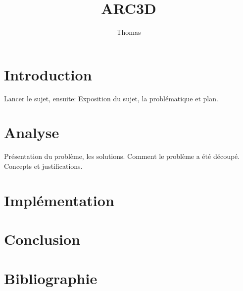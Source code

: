 \documentclass{report}
\author{Thomas \bsc{Roulin}}
\title{ARC3D}
\begin{document}
\maketitle



\tableofcontents

\chapter{Introduction}
Lancer le sujet, ensuite:
Exposition du sujet, la problématique et plan.


\chapter{Analyse}
 Présentation du problème, les solutions. Comment le problème a été découpé.
 Concepts et justifications.

\chapter{Implémentation}







\chapter{Conclusion}


\chapter{Bibliographie}
\end{document}
